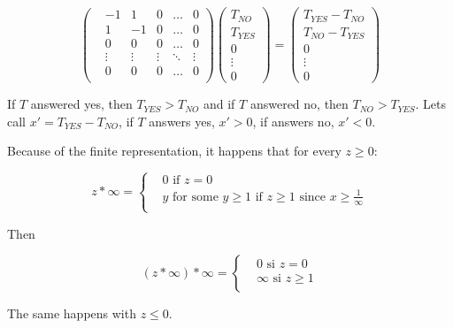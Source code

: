 \begin{equation*}
    \left(\begin{matrix}
        &-1     &1      &0      &\dots  &0      \\
        &1      &-1     &0      &\dots  &0      \\
        &0      &0      &0      &\dots  &0      \\
        &\vdots &\vdots &\vdots &\ddots &\vdots \\
        &0      &0      &0      &\dots  &0      \\
    \end{matrix}\right) 
    \left(\begin{matrix}
        T_{NO} \\
        T_{YES} \\ 
        0 \\
        \vdots \\
        0
    \end{matrix}\right) = 
    \left(\begin{matrix}
        T_{YES} - T_{NO} \\
        T_{NO} - T_{YES} \\ 
        0 \\
        \vdots \\
        0
    \end{matrix}\right)
\end{equation*}


If $T$ answered yes, then $T_{YES} > T_{NO}$ and if $T$ answered no, then $T_{NO} > T_{YES}$.
Lets call $x' = T_{YES} - T_{NO}$, if $T$ answers yes, $x' > 0$, if answers no, $x' < 0$.


Because of the finite representation, it happens that for every $z \ge 0$:

\[z *\infty = \begin{cases}
    &0 \text{ if } z = 0 \\
    &y \text{ for some } y \ge 1 \text{ if } z \ge 1 \text{ since } x \ge \frac{1}{\infty} \\
\end{cases}\]

Then

\[(z *\infty) *\infty= \begin{cases}
    &0 \text{ si } z = 0 \\
    &\infty \text{ si } z \ge 1 \\
\end{cases}\]

The same happens with $z \le 0$.

